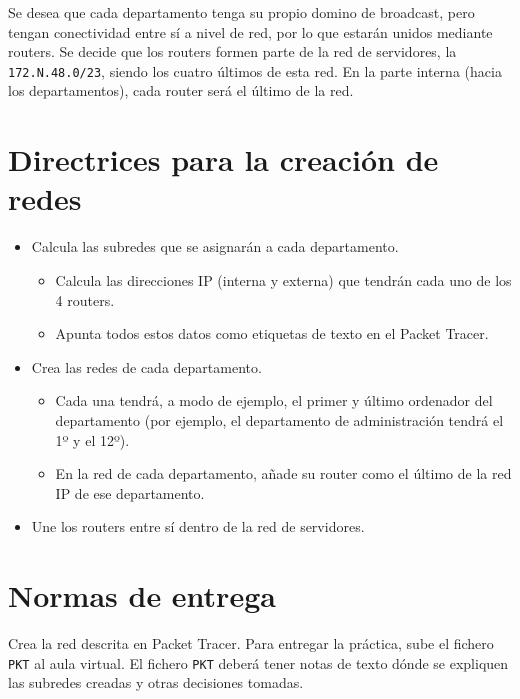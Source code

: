 Se desea que cada departamento tenga su propio domino de broadcast, pero tengan conectividad entre sí a nivel de red, por lo que estarán unidos mediante routers. Se decide que los routers formen parte de la red de servidores, la \texttt{172.N.48.0/23}, siendo los cuatro últimos de esta red. En la parte interna (hacia los departamentos), cada router será el último de la red.

\section{Directrices para la creación de redes}
\begin{itemize}
\item Calcula las subredes que se asignarán a cada departamento.
  \begin{itemize}
  \item Calcula las direcciones IP (interna y externa) que tendrán cada uno de los 4 routers.
  \item Apunta todos estos datos como etiquetas de texto en el Packet Tracer.
  \end{itemize}
\item Crea las redes de cada departamento.
  \begin{itemize}
  \item Cada una tendrá, a modo de ejemplo, el primer y último ordenador del departamento (por ejemplo, el departamento de administración tendrá el 1º y el 12º).
  \item En la red de cada departamento, añade su router como el último de la red IP de ese departamento.
  \end{itemize}
\item Une los routers entre sí dentro de la red de servidores.
\end{itemize}


\section{Normas de entrega}
Crea la red descrita en Packet Tracer. Para entregar la práctica, sube el fichero \texttt{PKT} al aula virtual. El fichero \texttt{PKT} deberá tener notas de texto dónde se expliquen las subredes creadas y otras decisiones tomadas.

